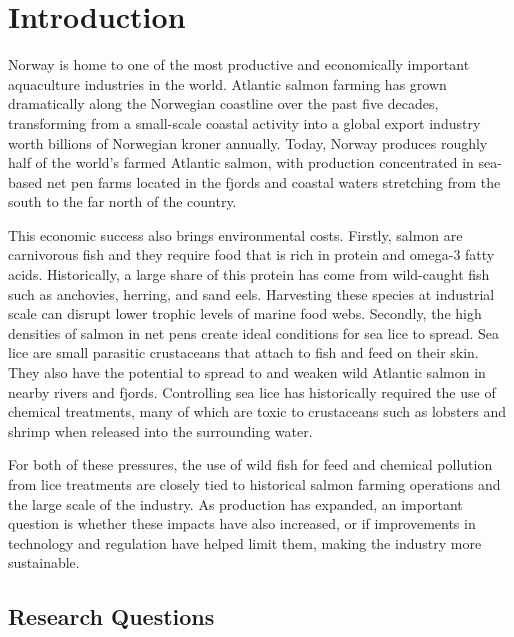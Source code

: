 \documentclass[12pt, a4paper]{report}
\begin{document}
\tableofcontents
\newpage


\setcounter{page}{1}

\setcounter{chapter}{0}
\chapter{Introduction}

Norway is home to one of the most productive and economically important
aquaculture industries in the world. Atlantic salmon farming has grown
dramatically along the Norwegian coastline over the past five decades,
transforming from a small-scale coastal activity into a global export industry worth billions of Norwegian kroner annually. Today, Norway produces
roughly half of the world's farmed Atlantic salmon, with production concentrated in sea-based net pen farms located in the fjords and coastal waters stretching from the south to the far north of the country.

This economic success also brings environmental costs. Firstly, salmon are carnivorous fish and they require food that is rich in protein and omega-3 fatty acids. Historically, a large share of this protein has come from wild-caught fish such as anchovies, herring, and sand eels. Harvesting these species at industrial scale can disrupt lower trophic levels of marine food webs. Secondly, the high densities of salmon in net pens create ideal conditions for sea lice to spread. Sea lice are small parasitic crustaceans that attach to fish and feed on their skin. They also have the potential to spread to and weaken wild Atlantic salmon in nearby rivers and fjords. Controlling sea lice has historically required the use of chemical treatments, many of which are toxic to crustaceans such as lobsters and shrimp when released into
the surrounding water.

For both of these pressures, the use of wild fish for feed and chemical pollution from lice treatments are closely tied to historical salmon farming operations and the large scale of the industry. As production has expanded, an important question is whether these impacts have also increased, or if improvements in technology and regulation have helped limit them, making the industry more sustainable.


\section{Research Questions}
\end{document}
